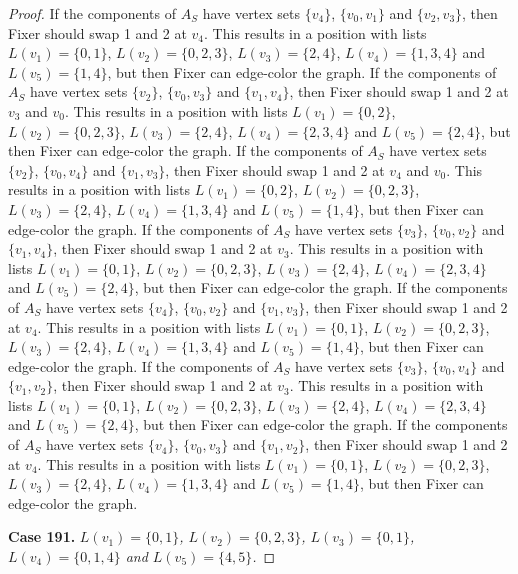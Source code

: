 \documentclass[12pt]{amsart}
\theoremstyle{plain}
\theoremstyle{definition}
\theoremstyle{remark}
\begin{document}
\begin{proof}
If the components of $A_S$ have vertex sets $\{v_4\}$, $\{v_0, v_1\}$ and $\{v_2, v_3\}$, then Fixer should swap 1 and 2 at $v_4$. This results in a position with lists $L(v_1) = \{0, 1\}$, $L(v_2) = \{0, 2, 3\}$, $L(v_3) = \{2, 4\}$, $L(v_4) = \{1, 3, 4\}$ and $L(v_5) = \{1, 4\}$, but then Fixer can edge-color the graph.
If the components of $A_S$ have vertex sets $\{v_2\}$, $\{v_0, v_3\}$ and $\{v_1, v_4\}$, then Fixer should swap 1 and 2 at $v_3$ and $v_0$. This results in a position with lists $L(v_1) = \{0, 2\}$, $L(v_2) = \{0, 2, 3\}$, $L(v_3) = \{2, 4\}$, $L(v_4) = \{2, 3, 4\}$ and $L(v_5) = \{2, 4\}$, but then Fixer can edge-color the graph.
If the components of $A_S$ have vertex sets $\{v_2\}$, $\{v_0, v_4\}$ and $\{v_1, v_3\}$, then Fixer should swap 1 and 2 at $v_4$ and $v_0$. This results in a position with lists $L(v_1) = \{0, 2\}$, $L(v_2) = \{0, 2, 3\}$, $L(v_3) = \{2, 4\}$, $L(v_4) = \{1, 3, 4\}$ and $L(v_5) = \{1, 4\}$, but then Fixer can edge-color the graph.
If the components of $A_S$ have vertex sets $\{v_3\}$, $\{v_0, v_2\}$ and $\{v_1, v_4\}$, then Fixer should swap 1 and 2 at $v_3$. This results in a position with lists $L(v_1) = \{0, 1\}$, $L(v_2) = \{0, 2, 3\}$, $L(v_3) = \{2, 4\}$, $L(v_4) = \{2, 3, 4\}$ and $L(v_5) = \{2, 4\}$, but then Fixer can edge-color the graph.
If the components of $A_S$ have vertex sets $\{v_4\}$, $\{v_0, v_2\}$ and $\{v_1, v_3\}$, then Fixer should swap 1 and 2 at $v_4$. This results in a position with lists $L(v_1) = \{0, 1\}$, $L(v_2) = \{0, 2, 3\}$, $L(v_3) = \{2, 4\}$, $L(v_4) = \{1, 3, 4\}$ and $L(v_5) = \{1, 4\}$, but then Fixer can edge-color the graph.
If the components of $A_S$ have vertex sets $\{v_3\}$, $\{v_0, v_4\}$ and $\{v_1, v_2\}$, then Fixer should swap 1 and 2 at $v_3$. This results in a position with lists $L(v_1) = \{0, 1\}$, $L(v_2) = \{0, 2, 3\}$, $L(v_3) = \{2, 4\}$, $L(v_4) = \{2, 3, 4\}$ and $L(v_5) = \{2, 4\}$, but then Fixer can edge-color the graph.
If the components of $A_S$ have vertex sets $\{v_4\}$, $\{v_0, v_3\}$ and $\{v_1, v_2\}$, then Fixer should swap 1 and 2 at $v_4$. This results in a position with lists $L(v_1) = \{0, 1\}$, $L(v_2) = \{0, 2, 3\}$, $L(v_3) = \{2, 4\}$, $L(v_4) = \{1, 3, 4\}$ and $L(v_5) = \{1, 4\}$, but then Fixer can edge-color the graph.

\noindent\textbf{Case 191.  }\textit{$L(v_1) = \{0, 1\}$, $L(v_2) = \{0, 2, 3\}$, $L(v_3) = \{0, 1\}$, $L(v_4) = \{0, 1, 4\}$ and $L(v_5) = \{4, 5\}$.}


\end{proof}
\end{document}
